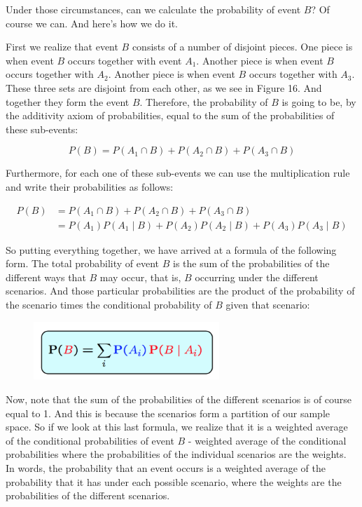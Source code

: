 \documentclass{tufte-handout}
\begin{document}
Under those circumstances, can we calculate the probability of event $B$? Of
course we can. And here's how we do it.


First we realize that event $B$ consists of a number of disjoint pieces. One piece is when event $B$ occurs
together with event $A_1$. Another piece is when event $B$ occurs together with $A_2$. Another piece is when
event $B$ occurs together with $A_3$. These three sets are disjoint from each other, as we see in Figure 16. 
And together they form the event $B$. Therefore, the probability of $B$ is going to be, by the
additivity axiom of probabilities, equal to the sum of the probabilities of these sub-events:

$$
P(B) = P(A_1 \cap B) + P(A_2 \cap B) + P(A_3 \cap B)
$$


Furthermore, for each one of these sub-events we can use the multiplication rule and write their
probabilities as follows:

\begin{align*}
P(B) &= P(A_1 \cap B) + P(A_2 \cap B) + P(A_3 \cap B)\\
       &= P(A_1) P(A_1 \mid B) + P(A_2) P(A_2 \mid B) + P(A_3) P(A_3 \mid B)
\end{align*}


So putting everything together, we have arrived at a formula of the following form. The total probability of event $B$
is the sum of the probabilities of the different ways that $B$ may occur, that is, $B$ occurring under the
different scenarios. And those particular probabilities are the product of the probability of the scenario
times the conditional probability of $B$ given that scenario:

\begin{figure}
  \includegraphics[width=7cm]{TotProbLaw}
\end{figure}


Now, note that the sum of the probabilities of the different scenarios is of course equal to 1. And this is
because the scenarios form a partition of our sample space. So if we look at this last formula, we
realize that it is a weighted average of the conditional probabilities of event $B$ - weighted average of the
conditional probabilities where the probabilities of the individual scenarios are the weights. In words,
the probability that an event occurs is a weighted average of the probability that it has under each
possible scenario, where the weights are the probabilities of the different scenarios.
\end{document}
